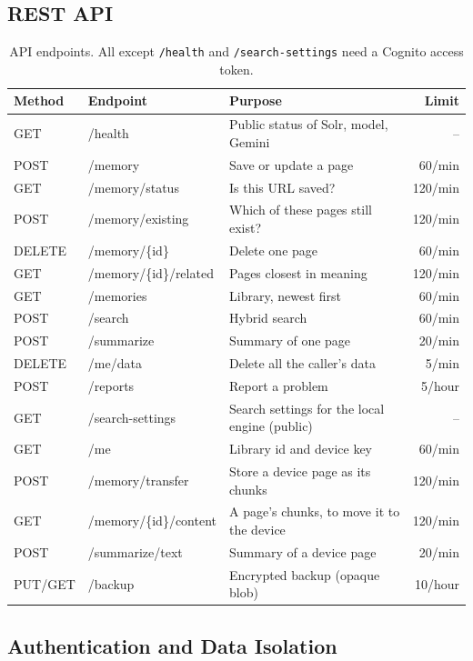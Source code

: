 \subsection{REST API}

\begin{table}[H]
\centering
\footnotesize
\begin{tabularx}{\textwidth}{>{\ttfamily}p{} >{\ttfamily}p{} L r}
\toprule
\textrm{\textbf{Method}} & \textrm{\textbf{Endpoint}} & \textbf{Purpose} & \textbf{Limit} \\
\midrule
GET & /health & Public status of Solr, model, Gemini & -- \\
POST & /memory & Save or update a page & 60/min \\
GET & /memory/status & Is this URL saved? & 120/min \\
POST & /memory/existing & Which of these pages still exist? & 120/min \\
DELETE & /memory/\{id\} & Delete one page & 60/min \\
GET & /memory/\{id\}/related & Pages closest in meaning & 120/min \\
GET & /memories & Library, newest first & 60/min \\
POST & /search & Hybrid search & 60/min \\
POST & /summarize & Summary of one page & 20/min \\
DELETE & /me/data & Delete all the caller's data & 5/min \\
POST & /reports & Report a problem & 5/hour \\
GET & /search-settings & Search settings for the local engine (public) & -- \\
GET & /me & Library id and device key & 60/min \\
POST & /memory/transfer & Store a device page as its chunks & 120/min \\
GET & /memory/\{id\}/content & A page's chunks, to move it to the device & 120/min \\
POST & /summarize/text & Summary of a device page & 20/min \\
PUT/GET & /backup & Encrypted backup (opaque blob) & 10/hour \\
\bottomrule
\end{tabularx}
\caption{API endpoints. All except \texttt{/health} and \texttt{/search-settings} need a Cognito access token.}
\label{tab:api}
\end{table}

\subsection{Authentication and Data Isolation}

